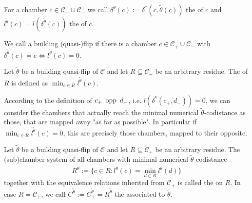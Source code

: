 \begin{defi}
	For a chamber $c \in \mathcal C_+ \cup \mathcal C_-$ we call $\delta^{\tilde \theta}(c) := \delta^*(c,\tilde \theta(c))$ the  of $c$ and $l^{\tilde \theta}(c) = l(\delta^{\tilde \theta}(c))$ the  of $c$.
\end{defi}

\begin{defi}
	We call a building (quasi-)flip  if there is a chamber $c \in \mathcal{C}_+ \cup \mathcal{C}_-$ with $\delta^{\tilde \theta}(c) = e \iff l^{\tilde \theta}(c) = 0$.
\end{defi}

\begin{defi}
	Let $\tilde \theta$ be a building quasi-flip of $\mathcal C$ and let $R \subseteq \mathcal C_+$ be an arbitrary residue. The  of $R$ is defined as $\min_{c \in R} l^{\tilde \theta}(c)$.
\end{defi}

According to the definition of $c_+ \opp d_-$, i.e. $l(\delta^*(c_+,d_-)) = 0$, we can consider the chambers that actually reach the minimal numerical $\tilde \theta$-codistance as those, that are mapped away "as far as possible". In particular if $\min_{c \in R} l^{\tilde \theta}(c) = 0$, this are precisely those chambers, mapped to their opposite.

\begin{defi}
	Let $\tilde \theta$ be a building quasi-flip of $\mathcal C$ and let $R \subseteq \mathcal C_+$ be an arbitrary residue. The (sub)chamber system of all chambers with minimal numerical $\tilde \theta$-codistance
	$$ R^{\tilde \theta} := \{ c \in R : l^{\tilde \theta}(c) = \min_{d \in R} l^{\tilde \theta}(d) \} $$
	together with the equivalence relations inherited from $\mathcal C_+$ is called the  on $R$. In case $R = \mathcal C_+$, we call $C^{\tilde \theta} := C_+^{\tilde \theta} = R^{\tilde \theta}$ the  associated to $\tilde \theta$.
\end{defi}